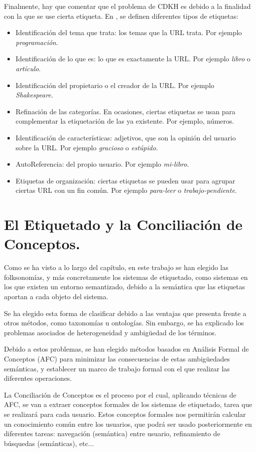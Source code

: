 Finalmente, hay que comentar que el problema de CDKH es debido a la finalidad con la que se use cierta etiqueta. En \cite{golder}, se definen diferentes tipos de etiquetas:
\begin{itemize}
	\item Identificación del tema que trata: los temas que la URL trata. Por ejemplo \emph{programación}.
	\item Identificación de lo que es: lo que es exactamente la URL. Por ejemplo \emph{libro} o \emph{artículo}.
	\item Identificación del propietario o el creador de la URL. Por ejemplo \emph{Shakespeare}.
	\item Refinación de las categorías. En ocasiones, ciertas etiquetas se usan para complementar la etiquetación de las ya existente. Por ejemplo, números.
	\item Identificación de características: adjetivos, que son la opinión del usuario sobre la URL. Por ejemplo \emph{gracioso} o \emph{estúpido}.
	\item AutoReferencia: del propio usuario. Por ejemplo \emph{mi-libro}.
	\item Etiquetas de organización: ciertas etiquetas se pueden usar para agrupar ciertas URL con un fin común. Por ejemplo \emph{para-leer} o \emph{trabajo-pendiente}.
\end{itemize}



\section{El Etiquetado y la Conciliación de Conceptos.}

Como se ha visto a lo largo del capítulo, en este trabajo se han elegido las folksonomías, y más concretamente los sistemas de etiquetado, como sistemas en los que existen un entorno semantizado, debido a la semántica que las etiquetas aportan a cada objeto del sistema. 

Se ha elegido esta forma de clasificar debido a las ventajas que presenta frente a otros métodos, como taxonomías u ontologías. Sin embargo, se ha explicado los problemas asociados de heterogeneidad y ambigüedad de los términos.

Debido a estos problemas, se han elegido métodos basados en Análisis Formal de Conceptos (AFC) para minimizar las consecuencias de estas ambigüedades semánticas, y establecer un marco de trabajo formal con el que realizar las diferentes operaciones.

La Conciliación de Conceptos es el proceso por el cual, aplicando técnicas de AFC, se van a extraer conceptos formales de los sistemas de etiquetado, tarea que se realizará para cada usuario. Estos conceptos formales nos permitirán calcular un conocimiento común entre los usuarios, que podrá ser usado posteriormente en diferentes tareas: navegación (semántica) entre usuario, refinamiento de búsquedas (semánticas), etc...
